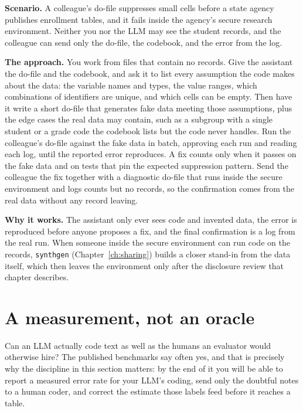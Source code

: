 \begin{appliedexample}\label{ae:ch13-harness}
\textbf{Scenario.} A colleague's do-file suppresses small cells before a state agency publishes enrollment tables, and it fails inside the agency's secure research environment. Neither you nor the LLM may see the student records, and the colleague can send only the do-file, the codebook, and the error from the log.

\medskip
\textbf{The approach.} You work from files that contain no records. Give the assistant the do-file and the codebook, and ask it to list every assumption the code makes about the data: the variable names and types, the value ranges, which combinations of identifiers are unique, and which cells can be empty. Then have it write a short do-file that generates fake data meeting those assumptions, plus the edge cases the real data may contain, such as a subgroup with a single student or a grade code the codebook lists but the code never handles. Run the colleague's do-file against the fake data in batch, approving each run and reading each log, until the reported error reproduces. A fix counts only when it passes on the fake data and on tests that pin the expected suppression pattern. Send the colleague the fix together with a diagnostic do-file that runs inside the secure environment and logs counts but no records, so the confirmation comes from the real data without any record leaving.

\medskip
\textbf{Why it works.} The assistant only ever sees code and invented data, the error is reproduced before anyone proposes a fix, and the final confirmation is a log from the real run. When someone inside the secure environment can run code on the records, \texttt{synthgen} (Chapter~\ref{ch:sharing}) builds a closer stand-in from the data itself, which then leaves the environment only after the disclosure review that chapter describes.
\end{appliedexample}

\section{A measurement, not an oracle}\label{sec:aiverify}
Can an LLM actually code text as well as the humans an evaluator would otherwise hire? The published benchmarks say often yes, and that is precisely why the discipline in this section matters: by the end of it you will be able to report a measured error rate for your LLM's coding, send only the doubtful notes to a human coder, and correct the estimate those labels feed before it reaches a table.

